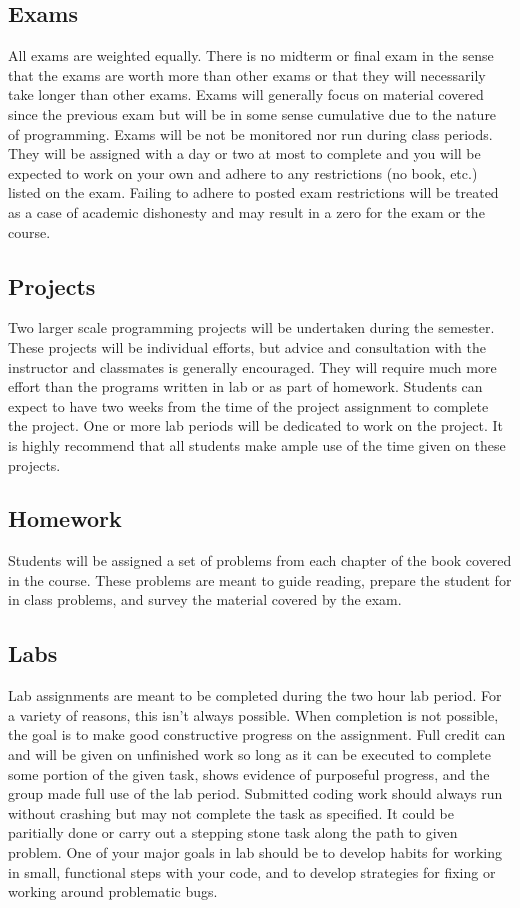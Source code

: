 \documentclass[10pt]{article}
\begin{document}
\subsection*{Exams}

All exams are weighted equally. There is no midterm or final exam in the sense that the exams are worth more than other exams or that they will necessarily take longer than other exams.  Exams will generally focus on material covered since the previous exam but will be in some sense cumulative due to the nature of programming. Exams will be not be monitored nor run during class periods. They will be assigned with a day or two at most to complete and you will be expected to work on your own and adhere to any restrictions (no book, etc.) listed on the exam. Failing to adhere to posted exam restrictions will be treated as a case of academic dishonesty and may result in a zero for the exam or the course.

\subsection*{Projects}

Two larger scale programming projects will be undertaken during the semester. These projects will be individual efforts, but advice and consultation with the instructor and classmates is generally encouraged. They will require much more effort than the programs written in lab or as part of homework. Students can expect to have two weeks from the time of the project assignment to complete the project. One or more lab periods will be dedicated to work on the project. It is highly recommend that all students make ample use of the time given on these projects.

\subsection*{Homework}

Students will be assigned a set of problems from each chapter of the book covered in the course. These problems are meant to guide reading, prepare the student for in class problems, and survey the material covered by the exam.

\subsection*{Labs}

Lab assignments are meant to be completed during the two hour lab period. For a variety of reasons, this isn't always possible. When completion is not possible, the goal is to make good constructive progress on the assignment. Full credit can and will be given on unfinished work so long as it can be executed to complete some portion of the given task, shows evidence of purposeful progress, and the group made full use of the lab period. Submitted coding work should always run without crashing but may not complete the task as specified. It could be paritially done or carry out a stepping stone task along the path to given problem. One of your major goals in lab should be to develop habits for working in small, functional steps with your code, and to develop strategies for fixing or working around problematic bugs.
\end{document}
